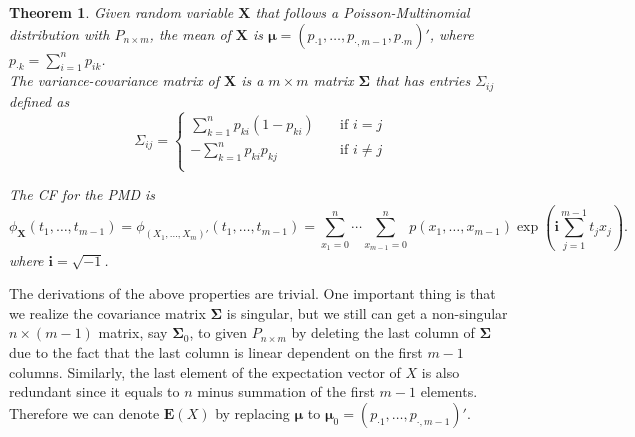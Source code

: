 \documentclass[12pt]{article}
\newcommand{\EE}{\mathbf{E}}
\newcommand{\ivec}{{\boldsymbol{i}}}
\newtheorem{thm}{Theorem}
\begin{document}
\begin{thm}
Given random variable $\boldsymbol{X}$ that follows a Poisson-Multinomial distribution with $P_{n\times m}$, the mean of $\boldsymbol{X}$ is 
   $\boldsymbol{\mu} = \left( p_{\cdot1} ,\dots,p_{\cdot,m-1},p_{\cdot m}\right)'$, where $p_{\cdot k} = \sum_{i=1}^{n}p_{i k}$. \\
The variance-covariance matrix of $\boldsymbol{X}$ is a $m \times m$ matrix $\boldsymbol{\Sigma}$ that has entries $\Sigma_{ij}$ defined as
\begin{equation*}
   \Sigma_{ij} = 
           \begin{cases}
             \sum_{k=1}^{n}p_{ki}(1-p_{ki}) & \quad \text{if } i=j\\
             -\sum_{k=1}^{n}p_{ki}p_{kj} & \quad \text{if } i \neq j\\
           \end{cases}
\end{equation*}

The CF for the PMD is 
\begin{equation*}
\phi_{\boldsymbol{X}}(t_1, \dots, t_{m-1}) = \phi_{(X_1,\dots,X_m)'}(t_1, \dots, t_{m-1})  =  \sum_{x_1 = 0}^{n}\cdots \sum_{x_{m-1} = 0}^n p(x_1,\ldots,x_{m-1})\exp\left(\ivec\sum_{j=1}^{m-1}t_jx_j\right).
\end{equation*}
where  $\ivec=\sqrt{-1}$.
\end{thm}
The derivations of the above properties are trivial. One important thing is that we realize the covariance matrix $\boldsymbol{\Sigma}$ is singular, but we still can get a non-singular $n \times (m-1)$ matrix, say $\boldsymbol{\Sigma}_{0}$, to given $P_{n \times m}$ by deleting the last column of $\boldsymbol{\Sigma}$ due to the fact that the last column is linear dependent on the first $m-1$ columns. Similarly, the last element of the expectation vector of $X$ is also redundant since it equals to $n$ minus summation of the first $m-1$ elements. Therefore we can denote $\EE(X)$ by replacing $\boldsymbol{\mu}$ to $\boldsymbol{\mu}_0 = \left( p_{\cdot1} ,\dots,p_{\cdot,m-1}\right)'$.
\end{document}
